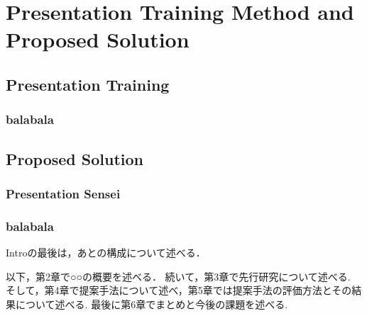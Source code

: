 \chapter[Presentation Training Method and Proposed Solution]{Presentation Training Method and\\ Proposed Solution}
\section{Presentation Training}

\subsection{balabala}

\section{Proposed Solution}

\subsection{Presentation Sensei}

\subsection{balabala}


Introの最後は，あとの構成について述べる．

 以下，第2章で○○の概要を述べる．
 続いて，第3章で先行研究について述べる.
 そして，第4章で提案手法について述べ，第5章では提案手法の評価方法とその結果について述べる.
 最後に第6章でまとめと今後の課題を述べる.
